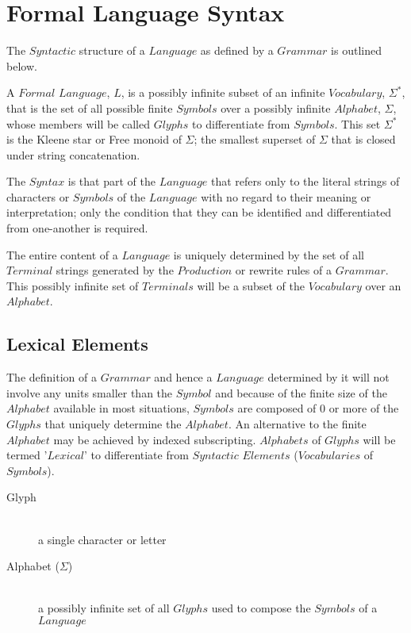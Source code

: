 \documentclass{article}
\begin{document}

\section{Formal Language Syntax}

The $Syntactic$ structure of a $Language$ as defined by a $Grammar$ is
outlined below.

A $Formal$ $Language$, $L$, is a possibly infinite subset of an
infinite $Vocabulary$, $\Sigma^*$, that is the set of all possible
finite $Symbols$ over a possibly infinite $Alphabet$, $\Sigma$, whose
members will be called $Glyphs$ to differentiate from $Symbols$. This
set $\Sigma^*$ is the Kleene star or Free monoid of $\Sigma$; the
smallest superset of $\Sigma$ that is closed under string
concatenation.

The $Syntax$ is that part of the $Language$ that refers only to the
literal strings of characters or $Symbols$ of the $Language$ with no
regard to their meaning or interpretation; only the condition that
they can be identified and differentiated from one-another is
required.

The entire content of a $Language$ is uniquely determined by the set
of all $Terminal$ strings generated by the $Production$ or rewrite
rules of a $Grammar$. This possibly infinite set of $Terminals$ will
be a subset of the $Vocabulary$ over an $Alphabet$.


\subsection{Lexical Elements}

The definition of a $Grammar$ and hence a $Language$ determined by it
will not involve any units smaller than the $Symbol$ and because of
the finite size of the $Alphabet$ available in most situations,
$Symbols$ are composed of 0 or more of the $Glyphs$ that uniquely
determine the $Alphabet$. An alternative to the finite $Alphabet$ may
be achieved by indexed subscripting. $Alphabets$ of $Glyphs$ will be
termed '$Lexical$' to differentiate from $Syntactic$ $Elements$
($Vocabularies$ of $Symbols$).

    \begin{description}

    \item[Glyph] \hfill \\
    a single character or letter

    \item[Alphabet ($\Sigma$)] \hfill \\
    a possibly infinite set of all $Glyphs$ used to compose the
    $Symbols$ of a $Language$

    \end{description}
\end{document}

